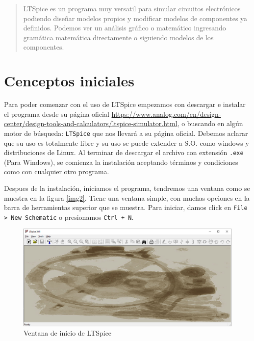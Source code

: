 \documentclass[a4paper]{article} %
\begin{document}
\begin{abstract}
	LTSpice es un programa muy versatil para simular circuitos electrónicos podiendo diseñar modelos propios y modificar modelos de componentes ya definidos. Podemos ver un análisis gráfico o matemático ingresando gramática matemática directamente o siguiendo modelos de los componentes.
\end{abstract}
	
\newpage
	
\section{Cenceptos iniciales}
\label{concepto}

Para poder comenzar con el uso de LTSpice empezamos con descargar e instalar el programa desde su página oficial \url{https://www.analog.com/en/design-center/design-tools-and-calculators/ltspice-simulator.html}, o buscando en algún motor de búsqueda: \texttt{LTSpice} que nos llevará a su página oficial. Debemos aclarar que su uso es totalmente libre y su uso se puede extender a S.O. como windows y distribuciones de Linux. Al terminar de descargar el archivo con extensión \texttt{.exe} (Para Windows), se comienza la instalación aceptando términos y condiciones como con cualquier otro programa.


Despues de la instalación, iniciamos el programa, tendremos una ventana como se muestra en la figura \eqref{img2}. Tiene una ventana simple, con muchas opciones en la barra de herramientas superior que se muestra. Para iniciar, damos click en \texttt{File > New Schematic} o presionamos \texttt{Ctrl + N}.

\begin{figure} %
	\centering %
	\includegraphics[scale=0.5]{IMAGENES/img2} %
	\caption{Ventana de inicio de LTSpice} %
	\label{img2} %
\end{figure} %
\end{document}
